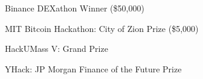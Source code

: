 
\begin{tightemize}
\item Binance DEXathon Winner (\$50,000)
\item MIT Bitcoin Hackathon: City of Zion Prize (\$5,000)
\item HackUMass V: Grand Prize
\item YHack: JP Morgan Finance of the Future Prize
\end{tightemize}
